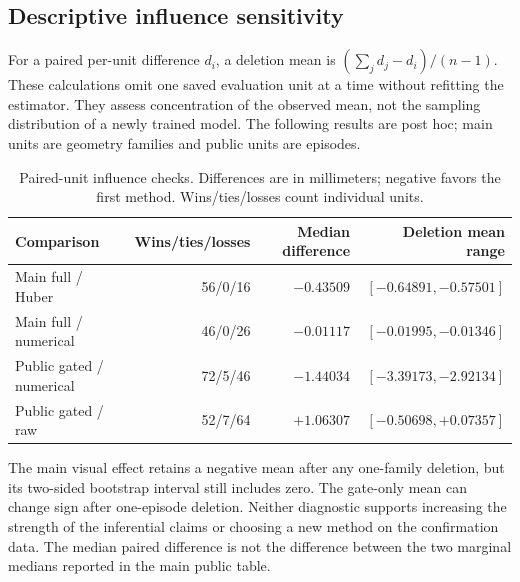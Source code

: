 \documentclass[11pt]{article}
\begin{document}
\subsection{Descriptive influence sensitivity}
For a paired per-unit difference $d_i$, a deletion mean is $(\sum_jd_j-d_i)/(n-1)$. These calculations omit one saved evaluation unit at a time without refitting the estimator. They assess concentration of the observed mean, not the sampling distribution of a newly trained model. The following results are post hoc; main units are geometry families and public units are episodes.
\begin{table}[h]\centering\small
\caption{Paired-unit influence checks. Differences are in millimeters; negative favors the first method. Wins/ties/losses count individual units.}
\begin{tabular}{lrrr}\toprule Comparison & Wins/ties/losses & Median difference & Deletion mean range\\\midrule
Main full / Huber & 56/0/16 & $-0.43509$ & $[-0.64891,-0.57501]$\\
Main full / numerical & 46/0/26 & $-0.01117$ & $[-0.01995,-0.01346]$\\
Public gated / numerical & 72/5/46 & $-1.44034$ & $[-3.39173,-2.92134]$\\
Public gated / raw & 52/7/64 & $+1.06307$ & $[-0.50698,+0.07357]$\\\bottomrule
\end{tabular}\end{table}
The main visual effect retains a negative mean after any one-family deletion, but its two-sided bootstrap interval still includes zero. The gate-only mean can change sign after one-episode deletion. Neither diagnostic supports increasing the strength of the inferential claims or choosing a new method on the confirmation data. The median paired difference is not the difference between the two marginal medians reported in the main public table.
\end{document}
